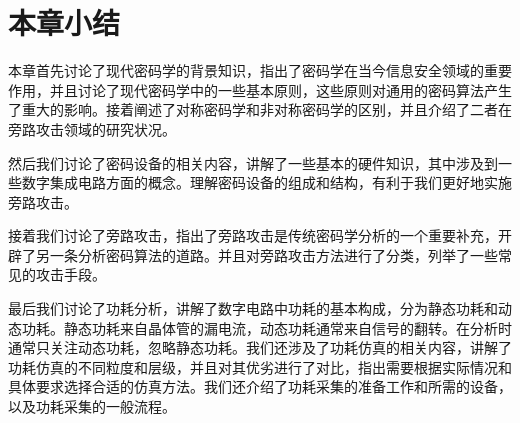 \section{本章小结}

本章首先讨论了现代密码学的背景知识，指出了密码学在当今信息安全领域的重要作用，并且讨论了现代密码学中的一些基本原则，这些原则对通用的密码算法产生了重大的影响。接着阐述了对称密码学和非对称密码学的区别，并且介绍了二者在旁路攻击领域的研究状况。

然后我们讨论了密码设备的相关内容，讲解了一些基本的硬件知识，其中涉及到一些数字集成电路方面的概念。理解密码设备的组成和结构，有利于我们更好地实施旁路攻击。

接着我们讨论了旁路攻击，指出了旁路攻击是传统密码学分析的一个重要补充，开辟了另一条分析密码算法的道路。并且对旁路攻击方法进行了分类，列举了一些常见的攻击手段。

最后我们讨论了功耗分析，讲解了数字电路中功耗的基本构成，分为静态功耗和动态功耗。静态功耗来自晶体管的漏电流，动态功耗通常来自信号的翻转。在分析时通常只关注动态功耗，忽略静态功耗。我们还涉及了功耗仿真的相关内容，讲解了功耗仿真的不同粒度和层级，并且对其优劣进行了对比，指出需要根据实际情况和具体要求选择合适的仿真方法。我们还介绍了功耗采集的准备工作和所需的设备，以及功耗采集的一般流程。






